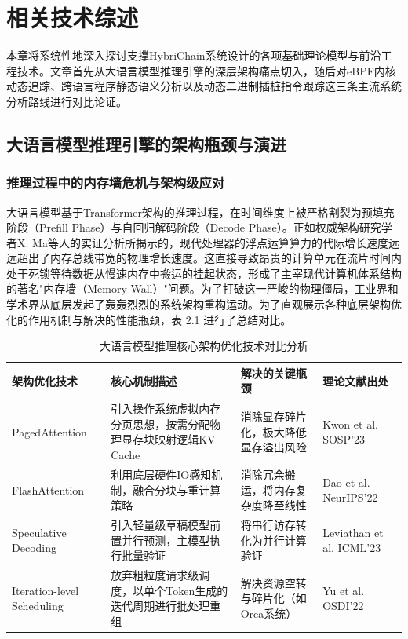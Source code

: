 
\chapter{相关技术综述}
\label{chap:background}

本章将系统性地深入探讨支撑HybriChain系统设计的各项基础理论模型与前沿工程技术。文章首先从大语言模型推理引擎的深层架构痛点切入，随后对eBPF内核动态追踪、跨语言程序静态语义分析以及动态二进制插桩指令跟踪这三条主流系统分析路线进行对比论证。

\section{大语言模型推理引擎的架构瓶颈与演进}

\subsection{推理过程中的内存墙危机与架构级应对}

大语言模型基于Transformer架构的推理过程，在时间维度上被严格割裂为预填充阶段（Prefill Phase）与自回归解码阶段（Decode Phase）。正如权威架构研究学者X. Ma等人的实证分析所揭示的，现代处理器的浮点运算算力的代际增长速度远远超出了内存总线带宽的物理增长速度。这直接导致昂贵的计算单元在流片时间内处于死锁等待数据从慢速内存中搬运的挂起状态，形成了主宰现代计算机体系结构的著名"内存墙（Memory Wall）"问题。为了打破这一严峻的物理僵局，工业界和学术界从底层发起了轰轰烈烈的系统架构重构运动。为了直观展示各种底层架构优化的作用机制与解决的性能瓶颈，表 2.1 进行了总结对比。

\begin{table}[H]
\centering
\caption{大语言模型推理核心架构优化技术对比分析}
\label{tab:arch_comparison}
\begin{tabular}{|p{3.2cm}|p{4.5cm}|p{3.5cm}|p{2.8cm}|}
\hline
\textbf{架构优化技术} & \textbf{核心机制描述} & \textbf{解决的关键瓶颈} & \textbf{理论文献出处} \\
\hline
PagedAttention & 引入操作系统虚拟内存分页思想，按需分配物理显存块映射逻辑KV Cache & 消除显存碎片化，极大降低显存溢出风险 & Kwon et al. SOSP'23 \\
\hline
FlashAttention & 利用底层硬件IO感知机制，融合分块与重计算策略 & 消除冗余搬运，将内存复杂度降至线性 & Dao et al. NeurIPS'22 \\
\hline
Speculative Decoding & 引入轻量级草稿模型前置并行预测，主模型执行批量验证 & 将串行访存转化为并行计算验证 & Leviathan et al. ICML'23 \\
\hline
Iteration-level Scheduling & 放弃粗粒度请求级调度，以单个Token生成的迭代周期进行批处理重组 & 解决资源空转与碎片化（如Orca系统） & Yu et al. OSDI'22 \\
\hline
\end{tabular}
\end{table}

